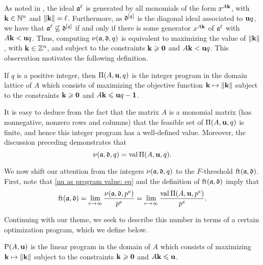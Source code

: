 \documentclass{amsart}
\begin{document}
As noted in ,  the ideal $\mathfrak{a}^{\ell}$ is generated by all monomials of the form $x^{A\mathbf{k}}$, with $\mathbf{k}\in \mathbb{N}^n$ and $\| \mathbf{k} \| = \ell$.  Furthermore, as $\mathfrak{d}^{[q]}$ is the diagonal ideal associated to $\mathbf{u}q$, we have that $\mathfrak{a}^{\ell} \not\subseteq \mathfrak{d}^{[q]}$ if and only if there is some generator $x^{A \mathbf{k}}$ of $\mathfrak{a}^{\ell}$ with $A\mathbf{k} < \mathbf{u}q$.  Thus, computing $\nu(\mathfrak{a},\mathfrak{d},q)$ is equivalent to maximizing the value of $\| \mathbf{k} \|$, with $\mathbf{k} \in \mathbb{Z}^n$, and subject to the constraints $\mathbf{k} \geqslant \mathbf{0}$ and $A\mathbf{k} < \mathbf{u}q$.
This observation motivates the following definition.

\begin{definition}
\label{IP: D}
   If $q$ is a positive integer, then $\Pi(A, \mathbf{u}, q)$ is the integer program in the domain lattice of $A$ which consists of maximizing the objective function $\mathbf{k} \mapsto \| \mathbf{k} \|$ subject to the constraints $\mathbf{k} \geqslant \mathbf{0}$ and $A \mathbf{k} \leqslant \mathbf{u}q - \mathbf{1}$.
\end{definition}

It is easy to deduce from the fact that the matrix $A$ is a monomial matrix (\ie has nonnegative, nonzero rows and columns) that the feasible set of $\Pi(A,\mathbf{u},q)$ is finite, and hence this integer program has a well-defined value.
Moreover, the discussion preceding  demonstrates that
%
\begin{equation}
\label{nu as program value: eq}
\nu(\mathfrak{a},\mathfrak{d},q) = \operatorname{val} \Pi(A,\mathbf{u},q).
\end{equation}

We now shift our attention from the integers $\nu(\mathfrak{a}, \mathfrak{d}, q)$ to the $F$-threshold $\operatorname{ft}(\mathfrak{a}, \mathfrak{d})$.  First, note that \eqref{nu as program value: eq} and the definition of $\operatorname{ft}(\mathfrak{a}, \mathfrak{d})$ imply that
%
\begin{equation}
\label{ft as limit of normalized program values: eq}
\operatorname{ft}(\mathfrak{a}, \mathfrak{d}) = \lim_{e\to\infty} \frac{\nu(\mathfrak{a},\mathfrak{d},p^e)}{p^e} = \lim_{e\to\infty} \frac{\operatorname{val} \Pi(A,\mathbf{u},p^e)}{p^e}.
\end{equation}

Continuing with our theme, we seek to describe this number in terms of a certain optimization program, which we define below.

\begin{definition}
\label{LP: D}
 $\mathrm{P}(A, \mathbf{u})$ is the linear program in the domain of $A$ which consists of maximizing $\mathbf{k} \mapsto \| \mathbf{k} \|$ subject to the constraints $\mathbf{k} \geqslant \mathbf{0}$ and $A \mathbf{k} \leqslant \mathbf{u}$.
\end{definition}
\end{document}
